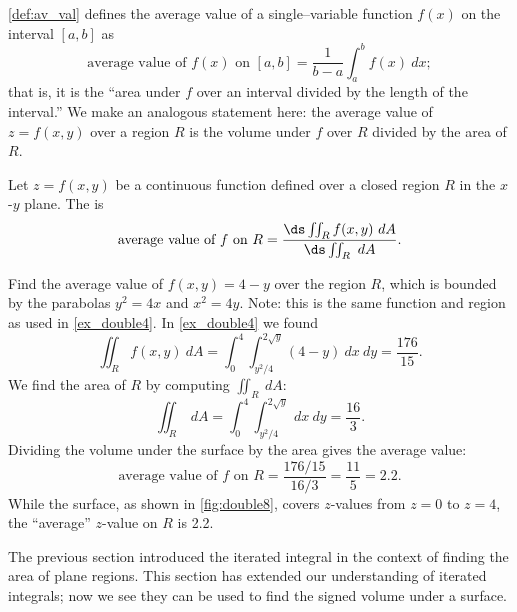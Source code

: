 \autoref{def:av_val} defines the average value of a single--variable function $f(x)$ on the interval $[a,b]$ as
$$\text{average value of $f(x)$ on $[a,b]$} = \frac1{b-a}\int_a^b f(x)\ dx;$$
that is, it is the ``area under $f$ over an interval divided by the length of the interval.'' We make an analogous statement here: the average value of $z=f(x,y)$ over a region $R$ is the volume under $f$ over $R$ divided by the area of $R$.

{Let $z=f(x,y)$ be a continuous function defined over a closed region $R$ in the $x$-$y$ plane. The  is 
$$\text{average value of $f$ on $R$} = \frac{\ds \iint_R f(x,y)\ dA}{\ds\iint_R \ dA}.$$}

{Find the average value of $f(x,y) = 4-y$ over the region $R$, which is bounded by the parabolas $y^2=4x$ and $x^2=4y$. Note: this is the same function and region as used in \autoref{ex_double4}.
}
{In \autoref{ex_double4} we found 
$$\iint_R f(x,y)\ dA = \int_0^4\int_{y^2/4}^{2\sqrt{y}}(4-y)\ dx\ dy = \frac{176}{15}.$$ 
We find the area of $R$ by computing $\iint_R \ dA$:
$$\iint_R \ dA = \int_0^4\int_{y^2/4}^{2\sqrt{y}} \ dx\ dy = \frac{16}{3}.$$
Dividing the volume under the surface by the area gives the average value:
$$\text{average value of $f$ on $R$} = \frac{176/15}{16/3} = \frac{11}5 = 2.2.$$
While the surface, as shown in \autoref{fig:double8}, covers $z$-values from $z=0$ to $z=4$, the ``average'' $z$-value on $R$ is 2.2.}

The previous section introduced the iterated integral in the context of finding the area of plane regions. This section has extended our understanding of iterated integrals; now we see they can be used to find the signed volume under a surface. 

